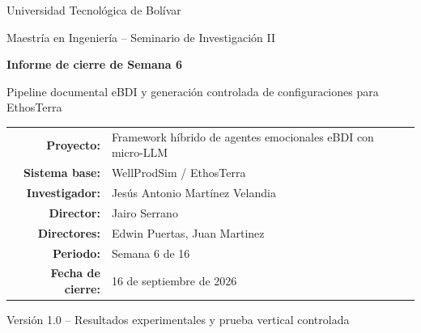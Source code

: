 \documentclass[11pt,a4paper]{article}
\begin{document}
\begin{titlepage}
    \centering
    \vspace*{1.5cm}

    {\large Universidad Tecnológica de Bolívar\par}
    \vspace{0.3cm}
    {\normalsize Maestría en Ingeniería -- Seminario de Investigación II\par}

    \vspace{2.5cm}
    {\LARGE\bfseries Informe de cierre de Semana 6\par}
    \vspace{0.5cm}
    {\large Pipeline documental eBDI y generación controlada de configuraciones para EthosTerra\par}

    \vspace{2.5cm}
    \begin{tabular}{rl}
        \textbf{Proyecto:} & Framework híbrido de agentes emocionales eBDI con micro-LLM \\
        \textbf{Sistema base:} & WellProdSim / EthosTerra \\
        \textbf{Investigador:} & Jesús Antonio Martínez Velandia \\
        \textbf{Director:} & Jairo Serrano \\
        \textbf{Directores:} & Edwin Puertas, Juan Martinez \\
        \textbf{Periodo:} & Semana 6 de 16 \\
        \textbf{Fecha de cierre:} & 16 de septiembre de 2026 \\
    \end{tabular}

    \vfill
    {\small Versión 1.0 -- Resultados experimentales y prueba vertical controlada\par}
    \vspace*{1cm}
\end{titlepage}

\newpage
\tableofcontents
\newpage

\end{document}
